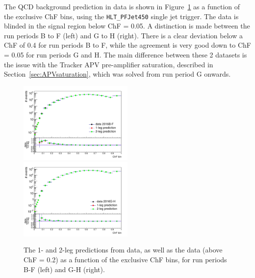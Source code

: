 The \ac{QCD} background prediction in data is shown in Figure~\ref{fig:prediction} as a function of the exclusive ChF bins, using the \texttt{HLT\_PFJet450} single jet trigger. The data is blinded in the signal region below ChF = 0.05. A distinction is made between the run periods B to F (left) and G to H (right). There is a clear deviation below a ChF of 0.4 for run periods B to F, while the agreement is very good down to ChF = 0.05 for run periods G and H. The main difference between these 2 datasets is the issue with the Tracker APV pre-amplifier saturation, described in Section~\ref{sec:APVsaturation}, which was solved from run period G onwards.

\begin{figure}[ht]
  \centering
  \includegraphics[width=0.5\textwidth]{figures/data_vs_prediction_BF_filters.pdf}\hfill%
  \includegraphics[width=0.5\textwidth]{figures/data_vs_prediction_GH_filters.pdf}
  \caption{The 1- and 2-leg predictions from data, as well as the data (above ChF = 0.2) as a function of the exclusive ChF bins, for run periods B-F (left) and G-H (right).}
  \label{fig:prediction}
\end{figure}


